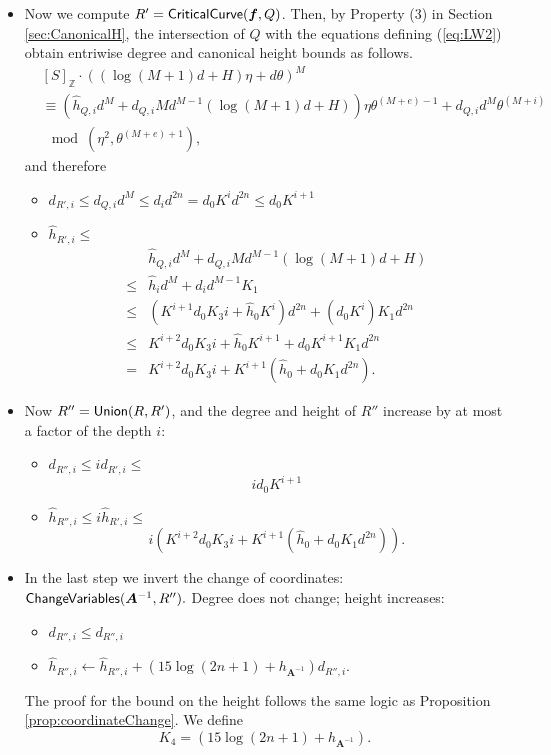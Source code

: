\documentclass[12pt]{article}
\def\mA{{\bm A}}
\newcommand{\ZZ}{{\mathbb{Z}}}
\def\CriticalCurve{{\sf CriticalCurve}}
\def\ChangeVariables{{\sf ChangeVariables}}
\def\Union{{\sf Union}}
\def\mA{{\bm A}}
\begin{document}
\begin{itemize}
\item Now we compute $R' = \CriticalCurve(\bm f,Q)$. Then, by Property (3) in Section \ref{sec:CanonicalH}, the intersection of $Q$ with the equations defining (\ref{eq:LW2}) obtain entriwise degree and canonical height bounds as follows. 
%
\begin{align*}
    &[S]_{\ZZ}\cdot ((\log(M+1)d + H)\eta + d\theta)^{M}
    \\
    &\equiv \left(\hat{h}_{Q,i}d^{M} + d_{Q,i} Md^{M-1}(\log(M+1)d + H)\right)\eta \theta^{(M+e)-1} + d_{Q,i} d^{M} \theta^{(M+i)} \\
    &\mod (\eta^2,\theta^{(M+e)+1}),
\end{align*}
%
and therefore 
\begin{itemize}
    \item $d_{R',i} \leq d_{Q,i}d^{M} \leq d_id^{2n} = d_0K^id^{2n} \leq d_0K^{i+1}$
    \item $\hat{h}_{R',i} \leq $
    \begin{align*}
    & \hat{h}_{Q,i}d^{M} + d_{Q,i}Md^{M-1}(\log(M+1)d+H)  \\
    \leq & \hat{h}_{i}d^{M} + d_{i}d^{M-1}K_1 \\
    \leq & (K^{i+1}d_0K_3i+\hat{h}_0K^i)d^{2n} + (d_0K^i)K_1d^{2n}\\
    \leq & K^{i+2}d_0K_3i+\hat{h}_0K^{i+1} + d_0K^{i+1}K_1d^{2n}\\
    =&K^{i+2}d_0K_3i + K^{i+1}(\hat{h}_0+d_0K_1d^{2n}).
    \end{align*}
\end{itemize}
%   




\item Now $R'' = \Union(R,R')$, and the degree and height of $R''$ increase by at most a factor of the depth $i$:
\begin{itemize}
    \item $d_{R'',i} \leq i d_{R',i} \leq$ 
    \[
    id_0K^{i+1}
    \]
    \item $\hat{h}_{R'',i} \leq i \hat{h}_{R',i} \leq$
    \[
    i\left(K^{i+2}d_0K_3i + K^{i+1}(\hat{h}_0+d_0K_1d^{2n})\right).
    \]
\end{itemize}





\item In the last step we invert the change of coordinates: $\ChangeVariables(\mA^{-1},R'').$ 
\newline 
Degree does not change; height increases: 
\begin{itemize}
        \item $d_{R'',i} \leq d_{R'',i}$  
        \item $\hat{h}_{R'',i} \gets \hat{h}_{R'',i}+(15\log(2n+1)+h_{\mA^{-1}})d_{R'',i}$.
\end{itemize}
%
The proof for the bound on the height follows the same logic as Proposition \ref{prop:coordinateChange}. We define 
\[
K_4 = (15\log(2n+1)+h_{\mA^{-1}}).
\]
%
\end{itemize}
\end{document}
